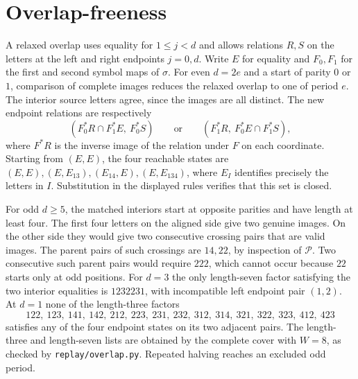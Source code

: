 \documentclass[10pt]{article}
\begin{document}
\section{Overlap-freeness}
A relaxed overlap uses equality for \(1\le j<d\) and allows relations \(R,S\) on the letters at the left and right endpoints \(j=0,d\). Write \(E\) for equality and \(F_0,F_1\) for the first and second symbol maps of \(\sigma\). For even \(d=2e\) and a start of parity \(0\) or \(1\), comparison of complete images reduces the relaxed overlap to one of period \(e\). The interior source letters agree, since the images are all distinct. The new endpoint relations are respectively
\[
 (F_0^*R\cap F_1^*E,\ F_0^*S)
 \qquad\text{or}\qquad
 (F_1^*R,\ F_0^*E\cap F_1^*S),
\]
where \(F^*R\) is the inverse image of the relation under \(F\) on each coordinate. Starting from \((E,E)\), the four reachable states are \((E,E),(E,E_{13}),(E_{14},E),(E,E_{134})\), where \(E_I\) identifies precisely the letters in \(I\). Substitution in the displayed rules verifies that this set is closed.

For odd \(d\ge5\), the matched interiors start at opposite parities and have length at least four. The first four letters on the aligned side give two genuine images. On the other side they would give two consecutive crossing pairs that are valid images. The parent pairs of such crossings are \(14,22\), by inspection of \(\mathcal P\). Two consecutive such parent pairs would require \(222\), which cannot occur because \(22\) starts only at odd positions. For \(d=3\) the only length-seven factor satisfying the two interior equalities is \(1232231\), with incompatible left endpoint pair \((1,2)\). At \(d=1\) none of the length-three factors
\[
 122,\ 123,\ 141,\ 142,\ 212,\ 223,\ 231,\ 232,\ 312,\ 314,\ 321,\ 322,\ 323,\ 412,\ 423
\]
satisfies any of the four endpoint states on its two adjacent pairs. The length-three and length-seven lists are obtained by the complete cover with \(W=8\), as checked by \texttt{replay/overlap.py}. Repeated halving reaches an excluded odd period.
\end{document}
